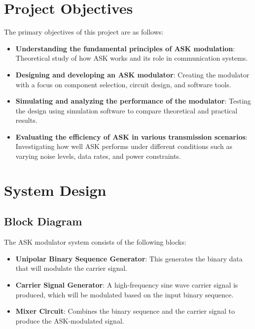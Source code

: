 \documentclass[12pt,a4paper]{article}
\begin{document}
\section*{Project Objectives}
The primary objectives of this project are as follows:
\begin{itemize}
    \item \textbf{Understanding the fundamental principles of ASK modulation}: Theoretical study of how ASK works and its role in communication systems.
    \item \textbf{Designing and developing an ASK modulator}: Creating the modulator with a focus on component selection, circuit design, and software tools.
    \item \textbf{Simulating and analyzing the performance of the modulator}: Testing the design using simulation software to compare theoretical and practical results.
    \item \textbf{Evaluating the efficiency of ASK in various transmission scenarios}: Investigating how well ASK performs under different conditions such as varying noise levels, data rates, and power constraints.
\end{itemize}

\section*{System Design}
\subsection*{Block Diagram}
The ASK modulator system consists of the following blocks:
\begin{itemize}
    \item \textbf{Unipolar Binary Sequence Generator}: This generates the binary data that will modulate the carrier signal.
    \item \textbf{Carrier Signal Generator}: A high-frequency sine wave carrier signal is produced, which will be modulated based on the input binary sequence.
    \item \textbf{Mixer Circuit}: Combines the binary sequence and the carrier signal to produce the ASK-modulated signal.
\end{itemize}
\end{document}
